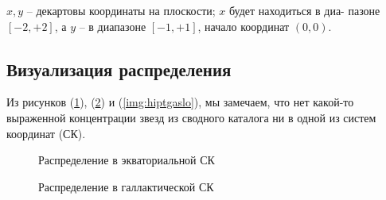 \documentclass[14pt]{article} %
\begin{document}
$x, y$ – декартовы координаты на плоскости; $x$ будет находиться в диа-
пазоне $\left[-2, +2\right]$, а $y$ – в диапазоне $\left[-1, +1\right]$, начало координат $(0, 0)$.


\subsection{Визуализация распределения}\label{sub:smthrs}

Из  рисунков (\ref{img:hiptgasra}), (\ref{img:hiptgasl}) и  (\ref{img:hiptgaslo}), мы замечаем, что нет какой-то выраженной концентрации звезд из сводного каталога ни в одной из систем координат (СК).

\begin{figure}[h!]
\caption{Распределение в экваториальной СК}
\label{img:hiptgasra}
\end{figure}
\begin{figure}[h!]
\caption{Распределение в галлактической СК}
\label{img:hiptgasl}
\end{figure}
\end{document}
